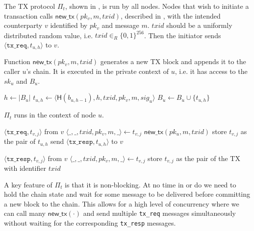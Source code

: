 The TX protocol $\Pi_t$, shown in , is run by all nodes.
Nodes that wish to initiate a transaction calls $\textsf{new\_tx}(pk_v, m, txid)$, described in , with the intended counterparty $v$ identified by $pk_v$ and message $m$.
$txid$ should be a uniformly distributed random value, i.e. $txid \in_R \{0, 1\}^{256}$.
Then the initiator sends $\langle \texttt{tx\_req}, t_{u, h}\rangle$ to $v$.

\begin{algorithm}
    \caption{Function $\textsf{new\_tx}(pk_v, m, txid)$ generates a new TX block and appends it to the caller $u$'s chain.
    It is executed in the private context of $u$, i.e. it has access to the $sk_u$ and $B_u$.}
    \label{alg:new-tx}

    \begin{algorithmic}
    \State $h \gets |B_u|$
    \State $t_{u, h} \gets \langle \textsf{H}(b_{u, h - 1}), h, txid, pk_v, m, sig_u \rangle$
    \State $B_u \gets B_u \cup \{ t_{u, h} \}$
    \end{algorithmic}
\end{algorithm}

\begin{algorithm}
    \caption{$\Pi_t$ runs in the context of node $u$.}
    \label{alg:tx-proto}

    \begin{algorithmic}
        \Upon $\langle \texttt{tx\_req}, t_{v, j} \rangle$ from $v$
        \State $\langle \_, \_, txid, pk_v, m, \_ \rangle \gets t_{v, j}$
        \State $\textsf{new\_tx}(pk_u, m, txid)$
        \State store $t_{v, j}$ as the pair of $t_{u, h}$
        \State send $\langle \texttt{tx\_resp}, t_{u, h} \rangle$ to $v$

        \Upon $\langle \texttt{tx\_resp}, t_{v, j} \rangle$ from $v$
        \State $\langle \_, \_, txid, pk_v, m, \_ \rangle \gets t_{v, j}$
        \State store $t_{v, j}$ as the pair of the TX with identifier $txid$
    \end{algorithmic}
\end{algorithm}

A key feature of $\Pi_t$ is that it is non-blocking.
At no time in  or  do we need to hold the chain state and wait for some message to be delivered before committing a new block to the chain.
This allows for a high level of concurrency where we can call many $\textsf{new\_tx}(\cdot)$ and send multiple \texttt{tx\_req} messages simultaneously without waiting for the corresponding \texttt{tx\_resp} messages.

